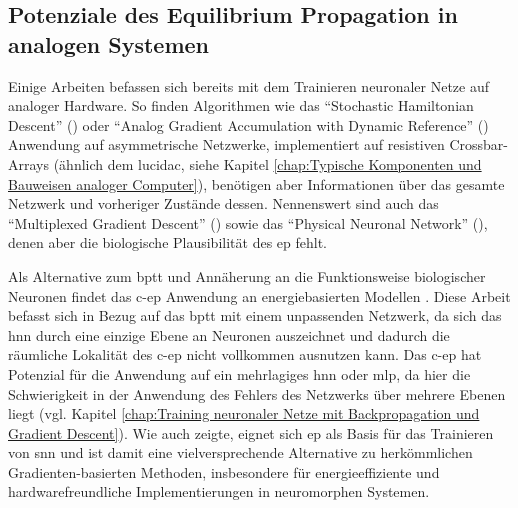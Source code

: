 \subsection{Potenziale des Equilibrium Propagation in analogen Systemen}
\label{chap:Potenziale des Equilibrium Propagation in analogen Systemen}

Einige Arbeiten befassen sich bereits mit dem Trainieren neuronaler Netze auf analoger Hardware. So finden Algorithmen wie das "`Stochastic Hamiltonian Descent"' (\cite{Onen2022}) oder "`Analog Gradient Accumulation with Dynamic Reference"' (\cite{Rasch2024}) Anwendung auf asymmetrische Netzwerke, implementiert auf resistiven Crossbar-Arrays (ähnlich \zb dem lucidac, siehe Kapitel \ref{chap:Typische Komponenten und Bauweisen analoger Computer}), benötigen aber Informationen über das gesamte Netzwerk und vorheriger Zustände dessen. Nennenswert sind auch das "`Multiplexed Gradient Descent"' (\cite{McCaughan2023}) sowie das "`Physical Neuronal Network"' (\cite{Sakemi2024}), denen aber die biologische Plausibilität des \ac{ep} fehlt.

Als Alternative zum \ac{bptt} und Annäherung an die Funktionsweise biologischer Neuronen findet das \ac{c-ep} Anwendung an energiebasierten Modellen \cite{Ernoult2020}. Diese Arbeit befasst sich in Bezug auf das \ac{bptt} mit einem unpassenden Netzwerk, da sich das \ac{hnn} durch eine einzige Ebene an Neuronen auszeichnet und dadurch die räumliche Lokalität des \ac{c-ep} nicht vollkommen ausnutzen kann. Das \ac{c-ep} hat Potenzial für die Anwendung auf ein mehrlagiges \ac{hnn} oder \ac{mlp}, da hier die Schwierigkeit in der Anwendung des Fehlers des Netzwerks über mehrere Ebenen liegt (vgl. Kapitel \ref{chap:Training neuronaler Netze mit Backpropagation und Gradient Descent}). Wie \cite{Martin2020} auch zeigte, eignet sich \ac{ep} als Basis für das Trainieren von \ac{snn} und ist damit eine vielversprechende Alternative zu herkömmlichen Gradienten-basierten Methoden, insbesondere für energieeffiziente und hardwarefreundliche Implementierungen in neuromorphen Systemen.
